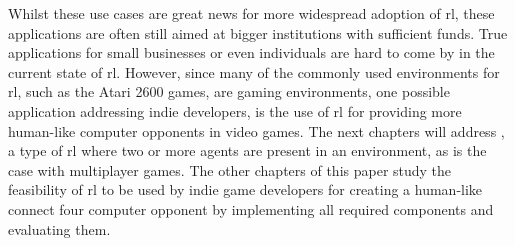 Whilst these use cases are great news for more widespread adoption of \gls{rl}, these applications are often still aimed at bigger institutions with sufficient funds.
True applications for small businesses or even individuals are hard to come by in the current state of \gls{rl}.
However, since many of the commonly used environments for \gls{rl}, such as the Atari 2600 games, are gaming environments, one possible application addressing indie developers, is the use of \gls{rl} for providing more human-like computer opponents in video games.
The next chapters will address , a type of  \gls{rl} where two or more agents are present in an environment, as is the case with multiplayer games. The other chapters of this paper study the feasibility of \gls{rl} to be used by indie game developers for creating a human-like connect four computer opponent by implementing all required components and evaluating them. 
